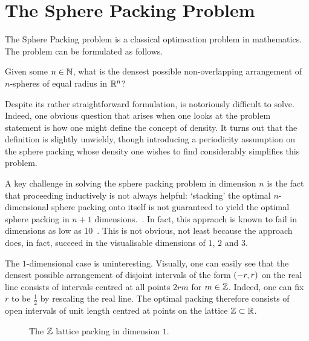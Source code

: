 \section{The Sphere Packing Problem}\label{Ch1:Sec:1_1_Sphere_Packing}

The Sphere Packing problem is a classical optimsation problem in mathematics. The problem can be formulated as follows.

\begin{boxproblem}\label{Ch1:Prob:SpherePacking_n}
    Given some $n \in \mathbb{N}$, what is the densest possible non-overlapping arrangement of $n$-spheres of equal radius in $\mathbb{R}^n$?
\end{boxproblem}

Despite its rather straightforward formulation,  is notoriously difficult to solve. Indeed, one obvious question that arises when one looks at the problem statement is how one might define the concept of density. It turns out that the definition is slightly unwieldy, though introducing a periodicity assumption on the sphere packing whose density one wishes to find considerably simplifies this problem.

A key challenge in solving the sphere packing problem in dimension $n$ is the fact that proceeding inductively is not always helpful: `stacking' the optimal $n$-dimensional sphere packing onto itself is not guaranteed to yield the optimal sphere packing in $n + 1$ dimensions.~\cite{CohnOnViazovskaICM}. In fact, this appraoch is known to fail in dimensions as low as $10$~\cite{CohnOnViazovskaAMS}. This is not obvious, not least because the approach does, in fact, succeed in the visualisable dimensions of $1$, $2$ and $3$.

The $1$-dimensional case is uninteresting. Visually, one can easily see that the densest possible arrangement of disjoint intervals of the form $\left( -r, r \right)$ on the real line consists of intervals centred at all points $2rm$ for $m \in \mathbb{Z}$. Indeed, one can fix $r$ to be $\frac{1}{2}$ by rescaling the real line. The optimal packing therefore consists of open intervals of unit length centred at points on the lattice $\mathbb{Z} \subset \mathbb{R}$.

\begin{figure}[htb]
    \centering
    \caption{The $\mathbb{Z}$ lattice packing in dimension $1$.}
    \label{Ch1:Fig:Z_Lattice_Packing_1D}
\end{figure}

